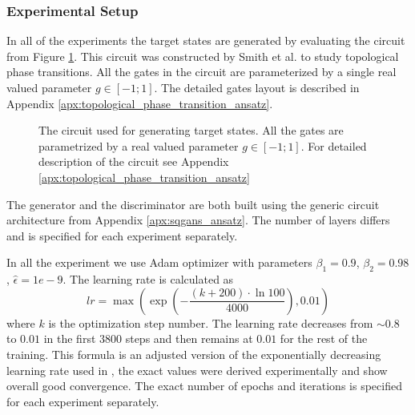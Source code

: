 \subsubsection{Experimental Setup}
In all of the experiments the target states are generated by evaluating the
circuit from Figure \ref{fig:phase_circuit_small}. This circuit was constructed
by Smith et al. \cite{smith2020crossing} to study topological phase transitions.
All the gates in the circuit are parameterized by a single real valued parameter
$g \in [-1;1]$. The detailed gates layout is described in Appendix \ref{apx:topological_phase_transition_ansatz}.
\begin{figure}[htbp!]
  \caption{The circuit used for generating target states. All the gates are
    parametrized by a real valued parameter $g \in [-1; 1]$. For detailed
    description of the circuit see Appendix
    \ref{apx:topological_phase_transition_ansatz} \label{fig:phase_circuit_small}}
\end{figure}

The generator and the discriminator are both built using the generic circuit
architecture from Appendix \ref{apx:sqgans_ansatz}. The number of layers differs
and is specified for each experiment separately.

In all the experiment we use Adam optimizer \cite{kingma2017adam} with
parameters $\beta_1 = 0.9$, $\beta_2=0.98$, $\hat{\epsilon} = 1e-9$. The
learning rate is calculated as
\begin{equation}
  lr = \max{\left(\exp{\left(-\frac{(k+200) \cdot \ln{100}}{4000}\right), 0.01}\right)}
\end{equation}
where $k$ is the optimization step number. The
learning rate decreases from $\sim 0.8$ to $0.01$ in the first $3800$ steps and then
remains at $0.01$ for the rest of the training. This formula is an adjusted
version of the exponentially decreasing learning rate used in
\cite{Dallaire_Demers_2018}, the exact values were derived
experimentally and show overall good convergence. The exact number of epochs and
iterations is specified for each experiment separately.
